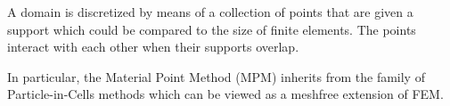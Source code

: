 
A domain is discretized by means of a collection of points that are given a support which could be compared to the size of finite elements.
The points interact with each other when their supports overlap.

In particular, the Material Point Method (MPM) inherits from the family of Particle-in-Cells methods which can be viewed as a meshfree extension of FEM. 


